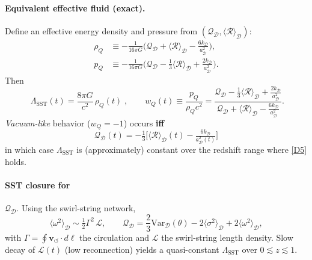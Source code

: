 \documentclass[10pt,reprint,aps,onecolumn,nofootinbib]{revtex4-2}
\newcommand{\vswirl}{\mathbf{v}_{\!\boldsymbol{\circlearrowleft}}}
\begin{document}
    \paragraph{Equivalent effective fluid (exact).}
        Define an effective energy density and pressure from $(\mathcal{Q}_\mathcal{D},\langle \mathcal{R} \rangle_\mathcal{D})$:
        \begin{align}
        \rho_{Q} &\equiv -\frac{1}{16\pi G}\Big(\mathcal{Q}_\mathcal{D}+\langle \mathcal{R}\rangle_\mathcal{D}
        - \tfrac{6k_\mathcal{D}}{a_\mathcal{D}^{2}}\Big), \tag{D2}\label{D2}\\
        p_{Q} &\equiv -\frac{1}{16\pi G}\Big(\mathcal{Q}_\mathcal{D}-\tfrac{1}{3}\langle \mathcal{R}\rangle_\mathcal{D}
        + \tfrac{2k_\mathcal{D}}{a_\mathcal{D}^{2}}\Big). \tag{D3}\label{D3}
        \end{align}
        Then
        \[
            \boxed{\;
            \Lambda_{\!\mathrm{SST}}(t)=\frac{8\pi G}{c^2}\,\rho_{Q}(t)
                \;},\qquad
            w_Q(t)\equiv\frac{p_Q}{\rho_Q c^2}
            =\frac{\mathcal{Q}_\mathcal{D}-\tfrac{1}{3}\langle \mathcal{R}\rangle_\mathcal{D}
            +\tfrac{2k_\mathcal{D}}{a_\mathcal{D}^{2}}}
            {\mathcal{Q}_\mathcal{D}+\langle \mathcal{R}\rangle_\mathcal{D}
            -\tfrac{6k_\mathcal{D}}{a_\mathcal{D}^{2}}}.
            \tag{D4}\label{D4}
        \]
        \emph{Vacuum-like} behavior ($w_Q=-1$) occurs \textbf{iff}
        \[
            \boxed{\;\mathcal{Q}_\mathcal{D}(t)= -\tfrac{1}{3}\Big[\langle \mathcal{R}\rangle_\mathcal{D}(t)-\tfrac{6k_\mathcal{D}}{a_\mathcal{D}^{2}(t)}\Big]\;}
            \tag{D5}\label{D5}
        \]
        in which case $\Lambda_{\!\mathrm{SST}}$ is (approximately) constant over the redshift range where \eqref{D5} holds.

    \paragraph{SST closure for }\(\mathcal{Q}_\mathcal{D}\).
        Using the swirl-string network,
        \[
            \langle \omega^2 \rangle_\mathcal{D} \sim \tfrac{1}{2}\Gamma^{2}\,\mathcal{L},\qquad
            \mathcal{Q}_\mathcal{D}=\frac{2}{3}\mathrm{Var}_\mathcal{D}(\theta)
            -2\langle \sigma^2\rangle_\mathcal{D}+2\langle \omega^2\rangle_\mathcal{D},
        \]
        with $\Gamma=\oint \vswirl\!\cdot d\boldsymbol{\ell}$ the circulation and
        $\mathcal{L}$ the swirl-string length density. Slow decay of $\mathcal{L}(t)$ (low reconnection) yields a quasi-constant $\Lambda_{\!\mathrm{SST}}$ over $0\lesssim z\lesssim 1$.
\end{document}
